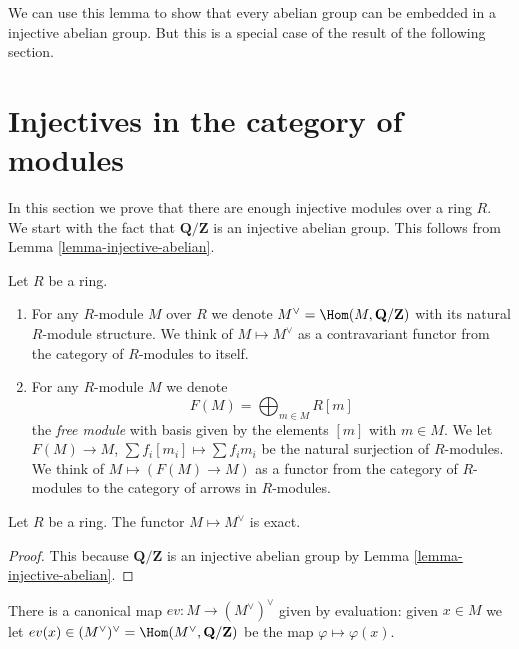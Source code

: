 \noindent
We can use this lemma to show that every abelian
group can be embedded in a injective abelian
group. But this is a special case of the result of
the following section.





\section{Injectives in the category of modules}
\label{section-injectives-modules}

\noindent
In this section we prove that there are enough injective modules over a ring
$R$. We start with the fact that $\mathbf{Q}/\mathbf{Z}$ is an injective
abelian group. This follows from Lemma \ref{lemma-injective-abelian}.

\begin{definition}
\label{definition-simple-functors}
Let $R$ be a ring.
\begin{enumerate}
\item For any $R$-module $M$ over $R$ we denote
$M^\vee = \Hom(M, \mathbf{Q}/\mathbf{Z})$
with its natural $R$-module structure. We think
of {\it $M \mapsto M^\vee$} as a contravariant functor
from the category of $R$-modules to itself.
\item For any $R$-module $M$ we denote
$$
F(M) = \bigoplus\nolimits_{m \in M} R[m]
$$
the {\it free module} with basis given by the elements $[m]$ with
$m \in M$. We let $F(M)\to M$, $\sum f_i [m_i] \mapsto \sum f_i m_i$
be the natural surjection of $R$-modules.
We think of $M \mapsto (F(M) \to M)$ as a functor from
the category of $R$-modules to the category of
arrows in $R$-modules.
\end{enumerate}
\end{definition}

\begin{lemma}
\label{lemma-vee-exact}
Let $R$ be a ring.
The functor $M \mapsto M^\vee$ is exact.
\end{lemma}

\begin{proof}
This because $\mathbf{Q}/\mathbf{Z}$
is an injective abelian group by Lemma \ref{lemma-injective-abelian}.
\end{proof}

\noindent
There is a canonical map $ev : M \to (M^\vee)^\vee$
given by evaluation: given $x \in M$ we let
$ev(x) \in (M^\vee)^\vee = \Hom(M^\vee, \mathbf{Q}/\mathbf{Z})$
be the map $\varphi \mapsto \varphi(x)$.

